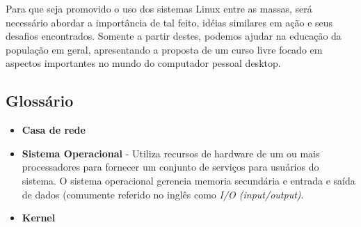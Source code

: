 \documentclass{article}
\begin{document}
Para que seja promovido o uso dos sistemas Linux entre as massas, será necessário abordar a importância de tal feito, idéias similares em ação e seus desafios encontrados. Somente a partir destes, podemos ajudar na educação da população em geral, apresentando a proposta de um curso livre focado em aspectos importantes no mundo do computador pessoal desktop.

\subsection{Glossário}

\begin{itemize}
\item \textbf{Casa de rede}
\item \textbf{Sistema Operacional} - Utiliza recursos de hardware de um ou mais processadores para fornecer um conjunto de serviços para usuários do sistema. O sistema operacional gerencia memoria secundária e entrada e saída de dados (comumente referido no inglês como \textit{I/O (input/output)}.
\item \textbf{Kernel}
\end{itemize}

\medskip

\printbibliography
\end{document}
